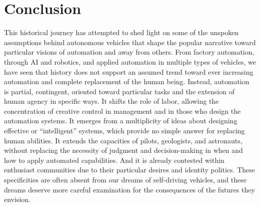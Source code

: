 \section{Conclusion}


This historical journey has attempted
to shed light on some of the unspoken assumptions behind autonomous
vehicles that shape the popular narrative toward
particular visions of automation and away from others. From factory
automation, through AI and robotics, and applied automation in
multiple types of vehicles, we have seen that history does not support
an assumed trend toward ever increasing automation and complete
replacement of the human being. Instead, automation is partial,
contingent, oriented toward particular tasks and the extension of
human agency in specific ways. It shifts the role of labor, allowing
the concentration of creative control in management and in those who
design the automation systems. It emerges from a multiplicity of ideas
about designing effective or ``intelligent'' systems, which provide no
simple answer for replacing human abilities. It extends the capacities of
pilots, geologists, and astronauts, without replacing the necessity of
judgment and decision-making in when and how to apply automated
capabilities. And it is already contested within enthusiast
communities due to their particular desires and identity politics.
These specificities are often absent
from our dreams of self-driving vehicles, and these dreams deserve
more careful examination for the consequences of the futures they envision.







